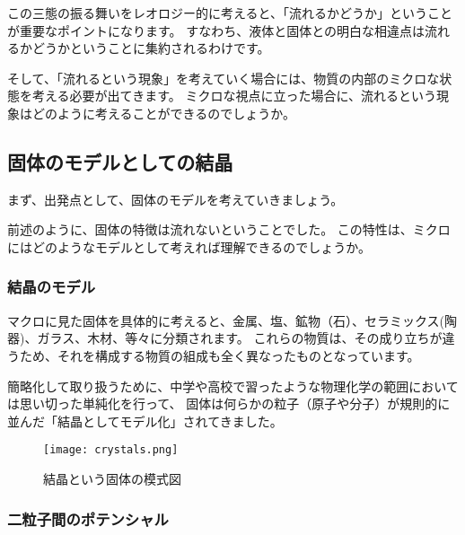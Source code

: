 \documentclass[uplatex,dvipdfmx,a4paper,11pt]{jsarticle}
\begin{document}
この三態の振る舞いをレオロジー的に考えると、「流れるかどうか」ということが重要なポイントになります。
すなわち、液体と固体との明白な相違点は流れるかどうかということに集約されるわけです。

そして、「流れるという現象」を考えていく場合には、物質の内部のミクロな状態を考える必要が出てきます。
ミクロな視点に立った場合に、流れるという現象はどのように考えることができるのでしょうか。

\subsection{固体のモデルとしての結晶}
まず、出発点として、固体のモデルを考えていきましょう。

前述のように、固体の特徴は流れないということでした。
この特性は、ミクロにはどのようなモデルとして考えれば理解できるのでしょうか。

\subsubsection{結晶のモデル}
マクロに見た固体を具体的に考えると、金属、塩、鉱物（石）、セラミックス(陶器)、ガラス、木材、等々に分類されます。
これらの物質は、その成り立ちが違うため、それを構成する物質の組成も全く異なったものとなっています。

簡略化して取り扱うために、中学や高校で習ったような物理化学の範囲においては思い切った単純化を行って、
固体は何らかの粒子（原子や分子）が規則的に並んだ「結晶としてモデル化」されてきました。

\begin{figure}[htb]
	\begin{center}
		\texttt{[image: crystals.png]}
		\caption{結晶という固体の模式図}
		\label{fig:crystals}
	\end{center}
\end{figure}

\subsubsection{二粒子間のポテンシャル}
\end{document}
